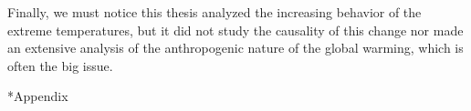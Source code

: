 \documentclass[11pt,a4paper,openany, twosided]{book}
\makeatletter
\renewcommand\part{%
	\if@openright
	\cleardoublepage
	\else
	\clearpage
	\fi
	\thispagestyle{empty}%
	\if@twocolumn
	\onecolumn
	\@tempswatrue
	\else
	\@tempswafalse
	\fi
	\null\vfil
	\secdef\@part\@spart}
\let\origappendix\appendix %
\renewcommand\appendix{\clearpage\pagenumbering{Roman}\origappendix}
\makeatother
\begin{document}
Finally, we must notice this thesis analyzed the increasing behavior of the extreme temperatures, but it did not study the causality of this change nor made an extensive analysis of the anthropogenic nature of the global warming, which is often the big issue.

\thispagestyle{empty}



{}
\part*{Appendix}
\appendix







\setlength{\parindent}{5em}
\setlength{\parskip}{2em}
\renewcommand{\baselinestretch}{4.0}


\end{document}
